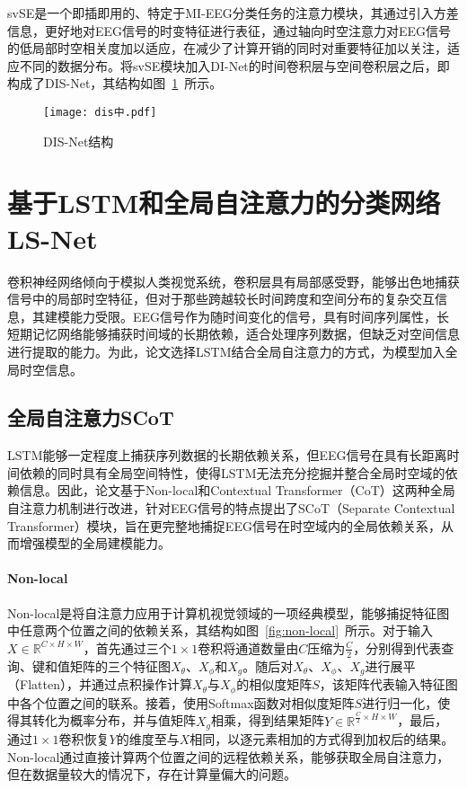svSE是一个即插即用的、特定于MI-EEG分类任务的注意力模块，其通过引入方差信息，更好地对EEG信号的时变特征进行表征，通过轴向时空注意力对EEG信号的低局部时空相关度加以适应，在减少了计算开销的同时对重要特征加以关注，适应不同的数据分布。将svSE模块加入DI-Net的时间卷积层与空间卷积层之后，即构成了DIS-Net，其结构如图~\ref{fig:dis}~所示。
\begin{figure}[ht]
  \centering
  \texttt{[image: dis中.pdf]}
  \caption{DIS-Net结构}
  \label{fig:dis}
\end{figure}


\section{基于LSTM和全局自注意力的分类网络LS-Net}

卷积神经网络倾向于模拟人类视觉系统，卷积层具有局部感受野，能够出色地捕获信号中的局部时空特征，但对于那些跨越较长时间跨度和空间分布的复杂交互信息，其建模能力受限。EEG信号作为随时间变化的信号，具有时间序列属性，长短期记忆网络能够捕获时间域的长期依赖，适合处理序列数据，但缺乏对空间信息进行提取的能力。为此，论文选择LSTM结合全局自注意力的方式，为模型加入全局时空信息。

\subsection{全局自注意力SCoT}

LSTM能够一定程度上捕获序列数据的长期依赖关系，但EEG信号在具有长距离时间依赖的同时具有全局空间特性，使得LSTM无法充分挖掘并整合全局时空域的依赖信息。因此，论文基于Non-local\cite{wang2018non}和Contextual Transformer（CoT）\cite{li2022contextual}这两种全局自注意力机制进行改进，针对EEG信号的特点提出了SCoT（Separate Contextual Transformer）模块，旨在更完整地捕捉EEG信号在时空域内的全局依赖关系，从而增强模型的全局建模能力。

\paragraph{Non-local}

Non-local是将自注意力\cite{vaswani2017attention}应用于计算机视觉领域的一项经典模型，能够捕捉特征图中任意两个位置之间的依赖关系，其结构如图~\ref{fig:non-local}~所示。对于输入\(X \in \mathbb{R}^{C \times H \times W}\)，首先通过三个\(1\times1\)卷积将通道数量由\(C\)压缩为\(\frac{C}{2}\)，分别得到代表查询、键和值矩阵的三个特征图\(X_\theta\)、\(X_\phi\)和\(X_g\)。随后对\(X_\theta\)、\(X_\phi\)、\(X_g\)进行展平（Flatten），并通过点积操作计算\(X_\theta\)与\(X_\phi\)的相似度矩阵\(S\)，该矩阵代表输入特征图中各个位置之间的联系。接着，使用Softmax函数对相似度矩阵\(S\)进行归一化，使得其转化为概率分布，并与值矩阵\(X_g\)相乘，得到结果矩阵\(Y \in \mathbb{R}^{\frac{C}{2} \times H \times W}\)，最后，通过\(1\times1\)卷积恢复\(Y\)的维度至与\(X\)相同，以逐元素相加的方式得到加权后的结果。Non-local通过直接计算两个位置之间的远程依赖关系，能够获取全局自注意力，但在数据量较大的情况下，存在计算量偏大的问题。


